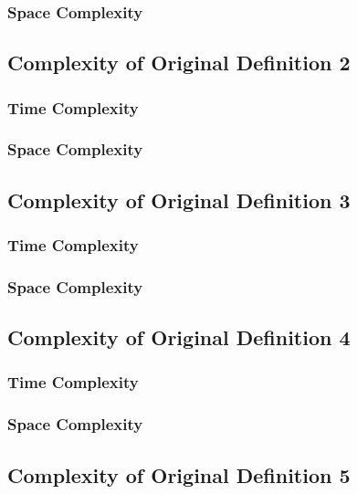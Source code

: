 \documentclass[conference]{IEEEtran}
\begin{document}
\subsubsection{Space Complexity}

\subsection{Complexity of Original Definition 2}

\subsubsection{Time Complexity}

\subsubsection{Space Complexity}

\subsection{Complexity of Original Definition 3}

\subsubsection{Time Complexity}

\subsubsection{Space Complexity}

\subsection{Complexity of Original Definition 4}

\subsubsection{Time Complexity}

\subsubsection{Space Complexity}

\subsection{Complexity of Original Definition 5}
\end{document}

